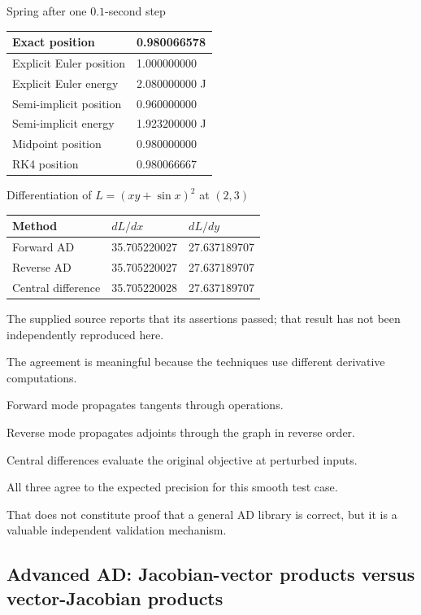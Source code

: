 Spring after one \(0.1\)-second step

{\def\LTcaptype{none} %
\begin{longtable}[]{@{}ll@{}}
\toprule\noalign{}
Exact position & 0.980066578 \\
\midrule\noalign{}
\endhead
\bottomrule\noalign{}
\endlastfoot
Explicit Euler position & 1.000000000 \\
Explicit Euler energy & 2.080000000 J \\
Semi-implicit position & 0.960000000 \\
Semi-implicit energy & 1.923200000 J \\
Midpoint position & 0.980000000 \\
RK4 position & 0.980066667 \\
\end{longtable}
}

Differentiation of \(L=(xy+\sin x)^2\) at \((2,3)\)

{\def\LTcaptype{none} %
\begin{longtable}[]{@{}lll@{}}
\toprule\noalign{}
Method & \(dL/dx\) & \(dL/dy\) \\
\midrule\noalign{}
\endhead
\bottomrule\noalign{}
\endlastfoot
Forward AD & 35.705220027 & 27.637189707 \\
Reverse AD & 35.705220027 & 27.637189707 \\
Central difference & 35.705220028 & 27.637189707 \\
\end{longtable}
}

The supplied source reports that its assertions passed; that result has not been independently reproduced here.

The agreement is meaningful because the techniques use different derivative computations.

Forward mode propagates tangents through operations.

Reverse mode propagates adjoints through the graph in reverse order.

Central differences evaluate the original objective at perturbed inputs.

All three agree to the expected precision for this smooth test case.

That does not constitute proof that a general AD library is correct, but it is a valuable independent validation mechanism.

\subsection{Advanced AD: Jacobian-vector products versus vector-Jacobian products}\label{02-foundations-ii-ch022-advanced-ad-jacobian-vector-products-versus-vector-jacobian-products}

